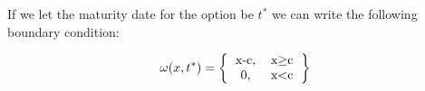 \documentclass{article}
\begin{document}
If we let the maturity date for the option be $t^{*}$ we can write the following boundary condition:

\begin{equation}
\omega(x, t^{*})=\left\{\begin{tabular}{cc}
{x-c}, &  x$\geq${c}\\
0, & x\textless{c}
\end{tabular}
\right\}
\end{equation}



 
\end{document}
